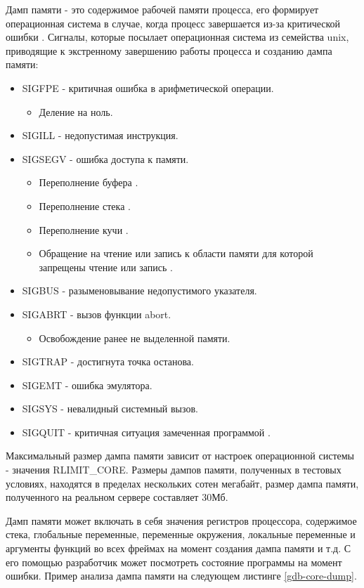 \documentclass[20pt]{article}
\begin{document}
Дамп памяти \cite{wiki/coredump} - это содержимое рабочей памяти процесса, его
формирует операционная система в случае, когда процесс завершается из-за
критической ошибки \cite{core-dump-signals} \cite{error-types}. Сигналы, которые
посылает операционная система из семейства unix, приводящие к экстренному завершению
работы процесса и созданию дампа памяти:
\begin{itemize}
  \item SIGFPE - критичная ошибка в арифметической операции.
  \begin{itemize}
    \item Деление на ноль.
  \end{itemize}
  \item SIGILL - недопустимая инструкция.
  \item SIGSEGV - ошибка доступа к памяти.
    \begin{itemize}
      \item Переполнение буфера \cite{buffer-overflow}.
      \item Переполнение стека \cite{stack-overflow}.
      \item Переполнение кучи \cite{heap-overflow}.
      \item Обращение на чтение или запись к области памяти для которой запрещены
      чтение или запись \cite{memory-corruption}.
    \end{itemize}
  \item SIGBUS - разыменовывание недопустимого указателя.
  \item SIGABRT - вызов функции abort.
    \begin{itemize}
      \item Освобождение ранее не выделенной памяти.
    \end{itemize}
  \item SIGTRAP - достигнута точка останова.
  \item SIGEMT - ошибка эмулятора.
  \item SIGSYS - невалидный системный вызов.
  \item SIGQUIT - критичная ситуация замеченная программой \cite{sigquit}.
\end{itemize}

Максимальный размер дампа памяти зависит от настроек операционной системы -
значения RLIMIT\_CORE. Размеры дампов памяти, полученных в тестовых условиях,
находятся в пределах нескольких сотен мегабайт, размер дампа памяти, полученного
на реальном сервере составляет 30Мб.

Дамп памяти может включать в себя значения регистров процессора, содержимое стека,
глобальные переменные, переменные окружения, локальные переменные и аргументы
функций во всех фреймах на момент создания дампа памяти и т.д. С его помощью
разработчик может посмотреть состояние программы на момент ошибки. Пример анализа
дампа памяти на следующем листинге \ref{gdb-core-dump}.
\end{document}
